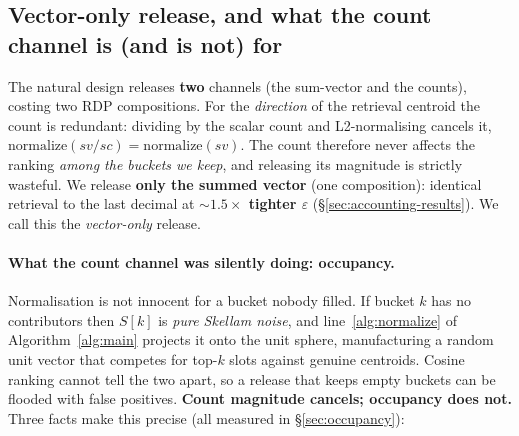 \documentclass[pdflatex,sn-mathphys-num,iicol]{sn-jnl}
\theoremstyle{thmstyleone}%
\theoremstyle{thmstyletwo}%
\theoremstyle{thmstylethree}%
\newcommand{\eps}{\varepsilon}
\newcommand{\secref}[1]{\S\ref{#1}}
\begin{document}
\subsection{Vector-only release, and what the count channel is (and is not)
for}\label{sec:vector-only}

The natural design releases \textbf{two} channels (the sum-vector and the counts),
costing two RDP compositions. For the \emph{direction} of the retrieval centroid the
count is redundant: dividing by the scalar count and L2-normalising cancels it,
$\mathrm{normalize}(sv/sc) = \mathrm{normalize}(sv)$. The count therefore never
affects the ranking \emph{among the buckets we keep}, and releasing its magnitude is
strictly wasteful. We release \textbf{only the summed vector} (one composition):
identical retrieval to the last decimal at \textbf{${\sim}1.5\times$ tighter $\eps$}
(\secref{sec:accounting-results}). We call this the \emph{vector-only} release.

\paragraph{What the count channel was silently doing: occupancy.} Normalisation is
not innocent for a bucket nobody filled. If bucket $k$ has no contributors then
$S[k]$ is \emph{pure Skellam noise}, and line~\ref{alg:normalize} of
Algorithm~\ref{alg:main} projects it onto the unit sphere, manufacturing a random
unit vector that competes for top-$k$ slots against genuine centroids. Cosine
ranking cannot tell the two apart, so a release that keeps empty buckets can be
flooded with false positives. \textbf{Count magnitude cancels; occupancy does not.}
Three facts make this precise (all measured in \secref{sec:occupancy}):
\end{document}
